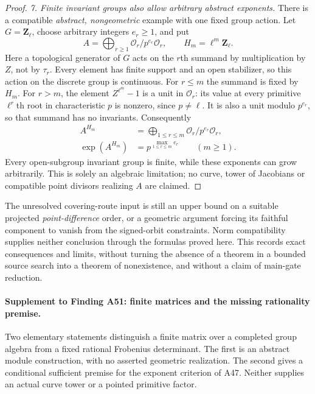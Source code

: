 \documentclass[11pt,a4paper]{article}
\begin{document}
\begin{proof}
\emph{7. Finite invariant groups also allow arbitrary abstract exponents.}
There is a compatible \emph{abstract, nongeometric} example
with one fixed group action. Let $G=\mathbf Z_\ell$, choose
arbitrary integers $e_r\ge1$, and put
\[
 A=\bigoplus_{r\ge1}\mathcal O_r/p^{e_r}\mathcal O_r,
 \qquad H_m=\ell^m\mathbf Z_\ell.
       \tag{NC.16}
\]
Here a topological generator of $G$ acts on the $r$th
summand by multiplication by $Z$, not by $\tau_r$.
Every element has finite support and an open stabilizer,
so this action on the discrete group is continuous.
For $r\le m$ the summand is fixed by $H_m$.
For $r>m$, the element $Z^{\ell^m}-1$ is a unit in
$\mathcal O_r$: its value at every primitive $\ell^r$th
root in characteristic $p$ is nonzero, since $p\ne\ell$.
It is also a unit modulo $p^{e_r}$, so that summand has no
invariants. Consequently
\[
\begin{aligned}
 A^{H_m}&=\bigoplus_{1\le r\le m}
                 \mathcal O_r/p^{e_r}\mathcal O_r,\\
 \exp(A^{H_m})&=p^{\max_{1\le r\le m}e_r}\qquad(m\ge1).
\end{aligned}
       \tag{NC.17}
\]
Every open-subgroup invariant group is finite, while these
exponents can grow arbitrarily. This is solely an algebraic
limitation; no curve, tower of Jacobians or compatible point
divisors realizing $A$ are claimed.
\end{proof}

The unresolved covering-route input is still an upper bound
on a suitable projected \emph{point-difference} order, or a
geometric argument forcing its faithful component to vanish
from the signed-orbit constraints. Norm compatibility supplies
neither conclusion through the formulas proved here. This
records exact consequences and limits, without turning the
absence of a theorem in a bounded source search into a theorem
of nonexistence, and without a claim of main-gate reduction.


\paragraph{Supplement to Finding A51: finite matrices and the missing rationality premise.}
Two elementary statements distinguish a finite matrix over a completed
group algebra from a fixed rational Frobenius determinant. The first is
an abstract module construction, with no asserted geometric realization.
The second gives a conditional sufficient premise for the exponent
criterion of A47. Neither supplies an actual curve tower or a pointed
primitive factor.
\end{document}
